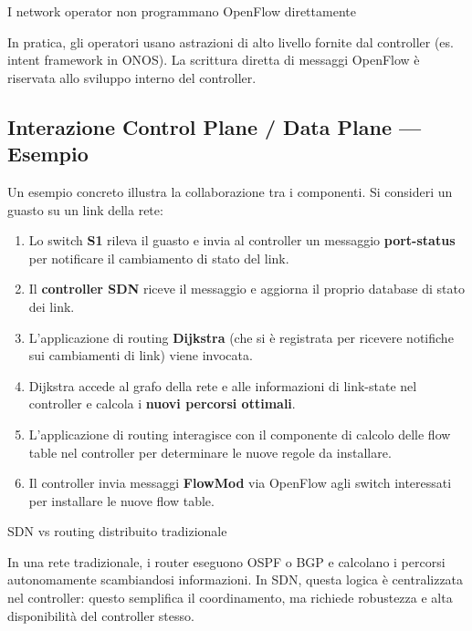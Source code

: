\documentclass[
  italian,
  openany]{book}
\providecommand{\tightlist}{%
  \setlength{\itemsep}{0pt}\setlength{\parskip}{0pt}}
\begin{document}
\begin{calloutwarning}{I network operator non programmano OpenFlow direttamente}

In pratica, gli operatori usano astrazioni di alto livello fornite dal
controller (es. intent framework in ONOS). La scrittura diretta di
messaggi OpenFlow è riservata allo sviluppo interno del controller.

\end{calloutwarning}

\subsection{Interazione Control Plane / Data Plane ---
Esempio}\label{interazione-control-plane-data-plane-esempio}

Un esempio concreto illustra la collaborazione tra i componenti. Si
consideri un guasto su un link della rete:

\begin{enumerate}
\def\labelenumi{\arabic{enumi}.}
\tightlist
\item
  Lo switch \textbf{S1} rileva il guasto e invia al controller un
  messaggio \textbf{port-status} per notificare il cambiamento di stato
  del link.
\item
  Il \textbf{controller SDN} riceve il messaggio e aggiorna il proprio
  database di stato dei link.
\item
  L'applicazione di routing \textbf{Dijkstra} (che si è registrata per
  ricevere notifiche sui cambiamenti di link) viene invocata.
\item
  Dijkstra accede al grafo della rete e alle informazioni di link-state
  nel controller e calcola i \textbf{nuovi percorsi ottimali}.
\item
  L'applicazione di routing interagisce con il componente di calcolo
  delle flow table nel controller per determinare le nuove regole da
  installare.
\item
  Il controller invia messaggi \textbf{FlowMod} via OpenFlow agli switch
  interessati per installare le nuove flow table.
\end{enumerate}

\begin{calloutnote}{SDN vs routing distribuito tradizionale}

In una rete tradizionale, i router eseguono OSPF o BGP e calcolano i
percorsi autonomamente scambiandosi informazioni. In SDN, questa logica
è centralizzata nel controller: questo semplifica il coordinamento, ma
richiede robustezza e alta disponibilità del controller stesso.

\end{calloutnote}
\end{document}
